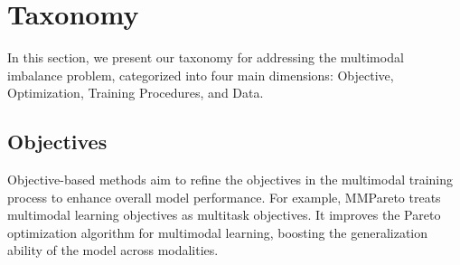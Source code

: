 \section{Taxonomy}
In this section, we present our taxonomy for addressing the multimodal imbalance problem, categorized into four main dimensions: Objective, Optimization, Training Procedures, and Data.

\subsection{Objectives}
Objective-based methods aim to refine the objectives in the multimodal training process to enhance overall model performance. For example, MMPareto treats multimodal learning objectives as multitask objectives. It improves the Pareto optimization algorithm for multimodal learning, boosting the generalization ability of the model across modalities.